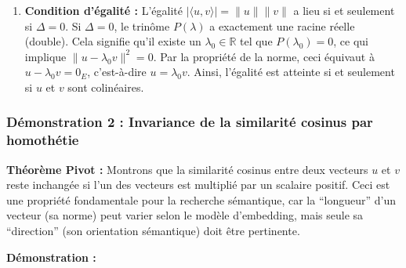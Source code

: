 \documentclass[11pt,a4paper]{report}
\begin{document}
\begin{enumerate}
  deux membres. Puisque \(\sqrt{x^2} = |x|\) pour tout réel \(x \ge 0\)
  et que les normes sont toujours non-négatives :
  \[ \sqrt{(\langle u, v \rangle)^2} \le \sqrt{\|u\|^2 \|v\|^2} \]
  \[ | \langle u, v \rangle | \le \|u\| \|v\| \] Ceci achève la
  démonstration de l'inégalité de Cauchy-Schwarz.
\item
  \textbf{Condition d'égalité :} L'égalité
  \(| \langle u, v \rangle | = \|u\| \|v\|\) a lieu si et seulement si
  \(\Delta = 0\). Si \(\Delta = 0\), le trinôme \(P(\lambda)\) a
  exactement une racine réelle (double). Cela signifie qu'il existe un
  \(\lambda_0 \in \mathbb{R}\) tel que \(P(\lambda_0) = 0\), ce qui
  implique \(\|u - \lambda_0 v\|^2 = 0\). Par la propriété de la norme,
  ceci équivaut à \(u - \lambda_0 v = 0_E\), c'est-à-dire
  \(u = \lambda_0 v\). Ainsi, l'égalité est atteinte si et seulement si
  \(u\) et \(v\) sont colinéaires.
\end{enumerate}

\hypertarget{duxe9monstration-2-invariance-de-la-similarituxe9-cosinus-par-homothuxe9tie}{%
\subsubsection{Démonstration 2 : Invariance de la similarité cosinus par
homothétie}\label{duxe9monstration-2-invariance-de-la-similarituxe9-cosinus-par-homothuxe9tie}}

\textbf{Théorème Pivot :} Montrons que la similarité cosinus entre deux
vecteurs \(u\) et \(v\) reste inchangée si l'un des vecteurs est
multiplié par un scalaire positif. Ceci est une propriété fondamentale
pour la recherche sémantique, car la ``longueur'' d'un vecteur (sa
norme) peut varier selon le modèle d'embedding, mais seule sa
``direction'' (son orientation sémantique) doit être pertinente.

\textbf{Démonstration :}
\end{document}
